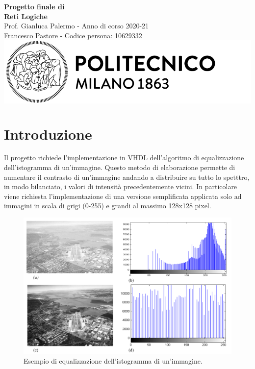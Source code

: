 \documentclass{article}
\begin{document}
\begin{titlepage}
    \centering
    \vspace*{\fill}
    \Huge\textbf{Progetto finale di \\ Reti Logiche}\\
    \vspace{5mm} %
    \Large Prof. Gianluca Palermo - Anno di corso 2020-21\\
    \vspace{5mm} %
    \large Francesco Pastore - Codice persona: 10629332\\
    \vspace{100mm}
    \includegraphics[scale=0.7]{logo.png}
    \vspace*{\fill}
\end{titlepage}

\thispagestyle{empty}
\tableofcontents
\pagebreak

\section{Introduzione}
Il progetto richiede l'implementazione in VHDL dell'algoritmo di equalizzazione dell'istogramma di un'immagine. Questo metodo di elaborazione permette di aumentare il contrasto di un'immagine andando a distribuire su tutto lo spetttro, in modo bilanciato, i valori di intensità precedentemente vicini. In particolare viene richiesta l'implementazione di una versione semplificata applicata solo ad immagini in scala di grigi (0-255) e grandi al massimo 128x128 pixel.
\begin{figure}[h]
    \includegraphics[scale=0.25]{equalization.png}
    \centering
    \caption{Esempio di equalizzazione dell'istogramma di un'immagine. \cite{equalization}}
\end{figure}
\end{document}
